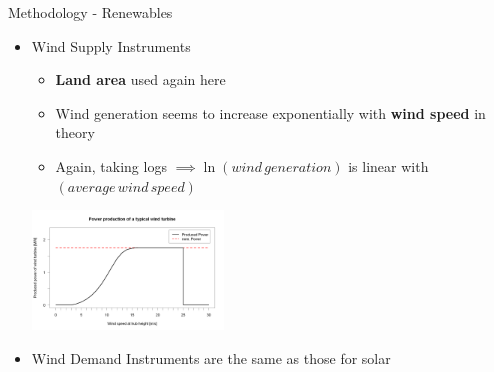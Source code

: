 \documentclass[11pt,aspectratio=169]{beamer}
\begin{document}
\begin{frame}{Methodology - Renewables}

\begin{itemize}
	\item Wind Supply Instruments
	
	\begin{itemize}
		\item \textbf{Land area} used again here
		\item Wind generation seems to increase exponentially with \textbf{wind speed} in theory
		\item Again, taking logs $\implies \ln(wind\,generation)$ is linear with $(average\,wind\,speed)$
	\end{itemize}

	\begin{center}
		\includegraphics[width=0.4\textwidth]{exhibits/windpowercurve.png} 
	\end{center}
	
	\item Wind Demand Instruments are the same as those for solar
	
\end{itemize}

\end{frame}
\end{document}
